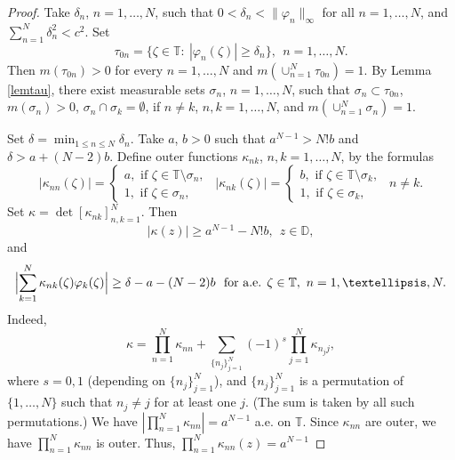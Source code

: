 \documentclass[10pt,a4paper]{amsart}
\begin{document}
\begin{proof}  Take $\delta_n$, $n=1,\ldots, N$, such that 
 $0<\delta_n<\|\varphi_n\|_\infty$ for all $n=1,\ldots, N$, and  $\sum_{n=1}^N\delta_n^2<c^2$. Set 
\begin{equation*}\tau_{0n}=\{\zeta\in\mathbb T:\ |\varphi_n(\zeta)|\geq \delta_n\}, \ \ n=1,\ldots, N.
\end{equation*}  
Then $m(\tau_{0n})>0$ for every $n=1,\ldots, N$ and $m(\cup_{n=1}^N\tau_{0n})=1$. By Lemma \ref{lemtau},  there exist measurable sets 
$\sigma_n$, $n=1,\ldots, N$, such that $\sigma_n\subset\tau_{0n}$, $m(\sigma_n)>0$, $\sigma_n\cap\sigma_k=\emptyset$, if $n\neq k$, 
$n,k=1, \ldots, N$, and  $m(\cup_{n=1}^N\sigma_n)=1$. 

Set $\delta=\min_{1\leq n\leq N}\delta_n$. Take $a$, $b>0$ such that $a^{N-1}>N!b$ and $\delta>a+(N-2)b$.
 Define outer functions $\kappa_{nk}$, $n,k=1, \ldots, N$, by the formulas
\begin{equation*} |\kappa_{nn}(\zeta)|=
\begin{cases} a, \text{ if }\zeta\in\mathbb T\setminus\sigma_n,\\ 1, \text{ if }\zeta\in\sigma_n,\end{cases} \ \  
|\kappa_{nk}(\zeta)|=
\begin{cases} b, \text{ if }\zeta\in\mathbb T\setminus\sigma_k,\\ 1, \text{ if }\zeta\in\sigma_k,\end{cases} \ \ n\neq k.
\end{equation*} 
Set $\kappa=\det[\kappa_{nk}]_{n,k=1}^N$. Then 
\begin{equation}\label{kappa}
|\kappa(z)|\geq a^{N-1}-N!b, \ \ z\in\mathbb D,
\end{equation} and 
\begin{equation}\label{kappaphi} \Bigl|\sum_{k=1}^N\kappa_{nk}(\zeta)\varphi_k(\zeta)\Bigr|\geq\delta-a-(N-2)b \  
\text{ for a.e. }\zeta\in\mathbb T,\  n=1,\ldots,N.
\end{equation} 
Indeed, 
\begin{equation*}
\kappa=\prod_{n=1}^N\kappa_{nn}+\sum_{\{n_j\}_{j=1}^N}(-1)^s\prod_{j=1}^N\kappa_{n_j j}, 
\end{equation*}
where $s=0,1$ (depending on  $\{n_j\}_{j=1}^N$), and $\{n_j\}_{j=1}^N$ is a permutation of $\{1,\ldots, N\}$ such that $n_j\neq j$ for at least one $j$.  (The sum is taken by all such permutations.)
We have
$|\prod_{n=1}^N\kappa_{nn}|=a^{N-1}$ a.e. on $\mathbb T$.   
Since $\kappa_{nn}$ are outer, we have $\prod_{n=1}^N\kappa_{nn}$ is outer. Thus, $\prod_{n=1}^N\kappa_{nn}(z)=a^{N-1}$ 

\end{proof}
\end{document}
